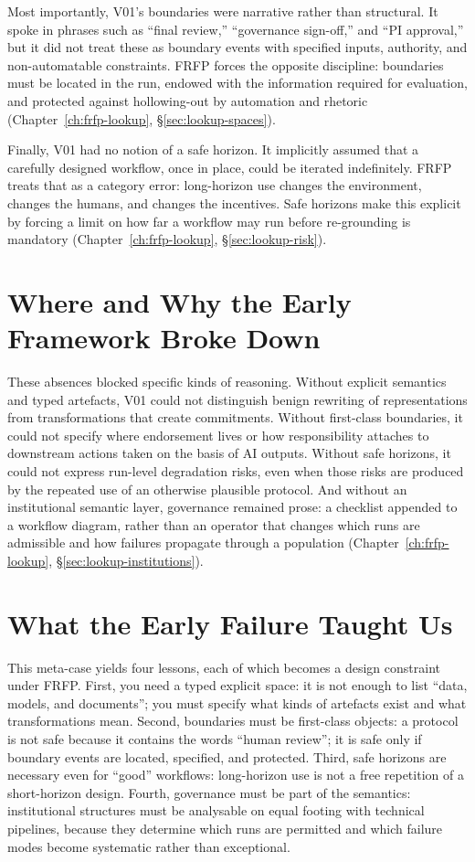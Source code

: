 Most importantly, V01’s boundaries were narrative rather than structural. It spoke in phrases such as ``final review,'' ``governance sign-off,'' and ``PI approval,'' but it did not treat these as boundary events with specified inputs, authority, and non-automatable constraints. FRFP forces the opposite discipline: boundaries must be located in the run, endowed with the information required for evaluation, and protected against hollowing-out by automation and rhetoric (Chapter~\ref{ch:frfp-lookup}, \S\ref{sec:lookup-spaces}).

Finally, V01 had no notion of a safe horizon. It implicitly assumed that a carefully designed workflow, once in place, could be iterated indefinitely. FRFP treats that as a category error: long-horizon use changes the environment, changes the humans, and changes the incentives. Safe horizons make this explicit by forcing a limit on how far a workflow may run before re-grounding is mandatory (Chapter~\ref{ch:frfp-lookup}, \S\ref{sec:lookup-risk}).

\section{Where and Why the Early Framework Broke Down}

These absences blocked specific kinds of reasoning. Without explicit semantics and typed artefacts, V01 could not distinguish benign rewriting of representations from transformations that create commitments. Without first-class boundaries, it could not specify where endorsement lives or how responsibility attaches to downstream actions taken on the basis of AI outputs. Without safe horizons, it could not express run-level degradation risks, even when those risks are produced by the repeated use of an otherwise plausible protocol. And without an institutional semantic layer, governance remained prose: a checklist appended to a workflow diagram, rather than an operator that changes which runs are admissible and how failures propagate through a population (Chapter~\ref{ch:frfp-lookup}, \S\ref{sec:lookup-institutions}).

\section{What the Early Failure Taught Us}

This meta-case yields four lessons, each of which becomes a design constraint under FRFP. First, you need a typed explicit space: it is not enough to list ``data, models, and documents''; you must specify what kinds of artefacts exist and what transformations mean. Second, boundaries must be first-class objects: a protocol is not safe because it contains the words ``human review''; it is safe only if boundary events are located, specified, and protected. Third, safe horizons are necessary even for ``good'' workflows: long-horizon use is not a free repetition of a short-horizon design. Fourth, governance must be part of the semantics: institutional structures must be analysable on equal footing with technical pipelines, because they determine which runs are permitted and which failure modes become systematic rather than exceptional.

